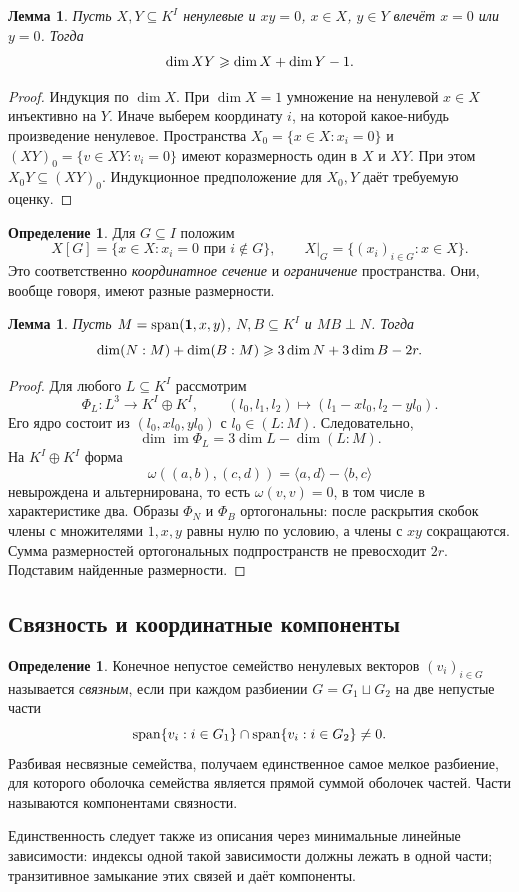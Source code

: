 \documentclass[11pt,a4paper]{article}
\numberwithin{equation}{section}
\theoremstyle{plain}
\newtheorem{lemma}[theorem]{Лемма}
\theoremstyle{definition}
\newtheorem{definition}[theorem]{Определение}
\DeclareMathOperator{\im}{im}\DeclareMathOperator{\supp}{supp}
\newcommand{\pair}[2]{\langle #1,#2\rangle}
\begin{document}
\begin{lemma}\label{lem:nz-growth}
Пусть $X,Y\subseteq K^I$ ненулевые и $xy=0$, $x\in X$, $y\in Y$
влечёт $x=0$ или $y=0$. Тогда
\[
 \dim XY\geqslant\dim X+\dim Y-1.
\]
\end{lemma}
\begin{proof}
Индукция по $\dim X$. При $\dim X=1$ умножение на ненулевой $x\in X$
инъективно на $Y$. Иначе выберем координату $i$, на которой какое-нибудь
произведение ненулевое. Пространства
$X_0=\{x\in X:x_i=0\}$ и $(XY)_0=\{v\in XY:v_i=0\}$ имеют
коразмерность один в $X$ и $XY$. При этом $X_0Y\subseteq(XY)_0$.
Индукционное предположение для $X_0,Y$ даёт требуемую оценку.
\end{proof}

\begin{definition}
Для $G\subseteq I$ положим
\[
 X[G]=\{x\in X:x_i=0\text{ при }i\notin G\},\qquad
 X|_G=\{(x_i)_{i\in G}:x\in X\}.
\]
Это соответственно \emph{координатное сечение} и \emph{ограничение}
пространства. Они, вообще говоря, имеют разные размерности.
\end{definition}

\begin{lemma}\label{lem:two-conductors}
Пусть $M=\operatorname{span}(\mathbf1,x,y)$, $N,B\subseteq K^I$ и $MB\perp N$.
Тогда
\[
 \dim(N:M)+\dim(B:M)\geqslant3\dim N+3\dim B-2r.
\]
\end{lemma}
\begin{proof}
Для любого $L\subseteq K^I$ рассмотрим
\[
 \Phi_L:L^3\longrightarrow K^I\oplus K^I,\qquad
 (l_0,l_1,l_2)\longmapsto(l_1-xl_0,l_2-yl_0).
\]
Его ядро состоит из $(l_0,xl_0,yl_0)$ с $l_0\in(L:M)$.
Следовательно,
\[
 \dim\im\Phi_L=3\dim L-\dim(L:M).
\]
На $K^I\oplus K^I$ форма
\[
 \omega((a,b),(c,d))=\pair{a}{d}-\pair{b}{c}
\]
невырождена и альтернирована, то есть $\omega(v,v)=0$, в том числе
в характеристике два. Образы $\Phi_N$ и $\Phi_B$ ортогональны:
после раскрытия скобок члены с множителями $1,x,y$ равны нулю по условию,
а члены с $xy$ сокращаются. Сумма размерностей ортогональных
подпространств не превосходит $2r$. Подставим найденные размерности.
\end{proof}

\subsection{Связность и координатные компоненты}

\begin{definition}
Конечное непустое семейство ненулевых векторов $(v_i)_{i\in G}$ называется
\emph{связным}, если при каждом разбиении $G=G_1\sqcup G_2$ на две
непустые части
\[
 \operatorname{span}\{v_i:i\in G_1\}\cap\operatorname{span}\{v_i:i\in G_2\}\ne0.
\]
Разбивая несвязные семейства, получаем единственное самое мелкое
разбиение, для которого оболочка семейства является прямой суммой
оболочек частей. Части называются компонентами связности.
\end{definition}
Единственность следует также из описания через минимальные линейные
зависимости: индексы одной такой зависимости должны лежать в одной
части; транзитивное замыкание этих связей и даёт компоненты.
\end{document}
